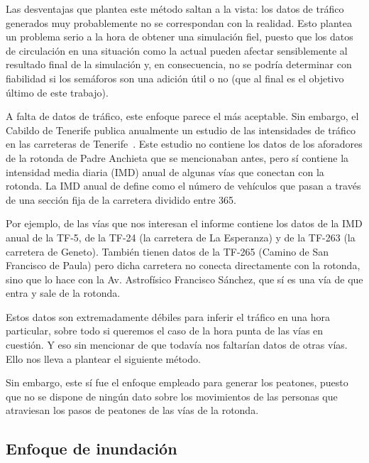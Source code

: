 Las desventajas que plantea este método saltan a la vista: los datos de tráfico generados muy probablemente no se correspondan con la realidad. Esto plantea un problema serio a la hora de obtener una simulación fiel, puesto que los datos de circulación en una situación como la actual pueden afectar sensiblemente al resultado final de la simulación y, en consecuencia, no se podría determinar con fiabilidad si los semáforos son una adición útil o no (que al final es el objetivo último de este trabajo).

A falta de datos de tráfico, este enfoque parece el más aceptable. Sin embargo, el Cabildo de Tenerife publica anualmente un estudio de las intensidades de tráfico en las carreteras de Tenerife~\cite{rodriguez_hernandez_intensidades_2019}. Este estudio no contiene los datos de los aforadores de la rotonda de Padre Anchieta que se mencionaban antes, pero sí contiene la intensidad media diaria (IMD) anual de algunas vías que conectan con la rotonda. La IMD anual de define como el número de vehículos que pasan a través de una sección fija de la carretera dividido entre 365.

Por ejemplo, de las vías que nos interesan el informe contiene los datos de la IMD anual de la TF-5, de la TF-24 (la carretera de La Esperanza) y de la TF-263 (la carretera de Geneto). También tienen datos de la TF-265 (Camino de San Francisco de Paula) pero dicha carretera no conecta directamente con la rotonda, sino que lo hace con la Av. Astrofísico Francisco Sánchez, que sí es una vía de que entra y sale de la rotonda.

Estos datos son extremadamente débiles para inferir el tráfico en una hora particular, sobre todo si queremos el caso de la hora punta de las vías en cuestión. Y eso sin mencionar de que todavía nos faltarían datos de otras vías. Ello nos lleva a plantear el siguiente método.

Sin embargo, este sí fue el enfoque empleado para generar los peatones, puesto que no se dispone de ningún dato sobre los movimientos de las personas que atraviesan los pasos de peatones de las vías de la rotonda.


\subsection{Enfoque de inundación}


